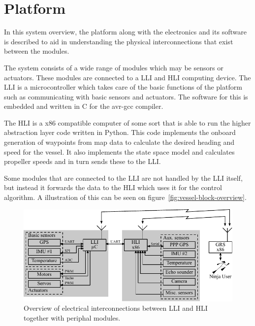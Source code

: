 \section{Platform}
\label{sec:platform}
In this system overview, the platform along with the electronics and its software is described to aid in understanding the physical interconnections that exist between the modules.

The system consists of a wide range of modules which may be sensors or actuators. These modules are connected to a \ac{LLI} and \ac{HLI} computing device. The \ac{LLI} is a microcontroller which takes care of the basic functions of the platform such as communicating with basic sensors and actuators. The software for this is embedded and written in C for the avr-gcc compiler.

The \ac{HLI} is a x86 compatible computer of some sort that is able to run the higher abstraction layer code written in Python. This code implements the onboard generation of waypoints from map data to calculate the desired heading and speed for the vessel. It also implements the state space model and calculates propeller speeds and in turn sends these to the \ac{LLI}.

Some modules that are connected to the \ac{LLI} are not handled by the \ac{LLI} itself, but instead it forwards the data to the \ac{HLI} which uses it for the control algorithm. A illustration of this can be seen on figure~\vref{fig:vessel-block-overview}.

\begin{figure}[htbp]
	\centering
	\includegraphics[width=\textwidth]{img/vessel-block-overview-electrical}
	\caption{Overview of electrical interconnections between \ac{LLI} and \ac{HLI} together with periphal modules.}
	\label{fig:vessel-block-overview-electrical}
\end{figure}
